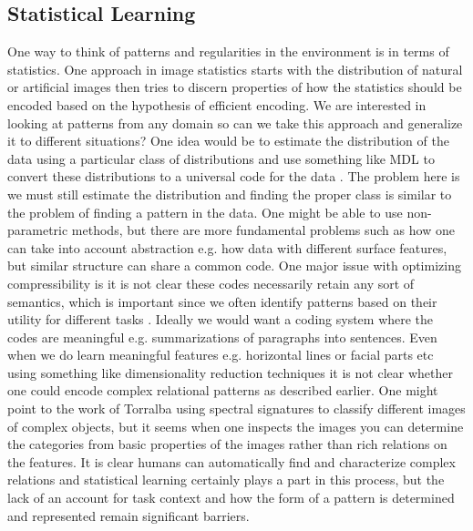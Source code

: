 \documentclass[doc]{apa}%
\begin{document}
\subsection{Statistical Learning}
One way to think of patterns and regularities in the environment is in
terms of statistics.  One approach in image statistics
\cite{Simoncelli01} starts with the distribution of natural or
artificial images then tries to discern properties of how the
statistics should be encoded based on the hypothesis of efficient
encoding.  We are interested in looking at patterns from any domain so
can we take this approach and generalize it to different situations?
One idea would be to estimate the distribution of the data using a
particular class of distributions and use something like MDL to
convert these distributions to a universal code for the data
\cite{MDLbook}.  The problem here is we must still estimate the
distribution and finding the proper class is similar to the problem of
finding a pattern in the data.  One might be able to use
non-parametric methods, but there are more fundamental problems such
as how one can take into account abstraction e.g. how data with
different surface features, but similar structure can share a common code.  One
major issue with optimizing compressibility is it is not clear
these codes necessarily retain any sort of semantics, which is
important since we often identify patterns based on their utility for
different tasks \cite{RossBFest}.  Ideally we would want a coding system where the
codes are meaningful e.g. summarizations of paragraphs into sentences.
Even when we do learn meaningful features e.g. horizontal lines or
facial parts etc using something like dimensionality reduction
techniques it is not clear whether one could encode complex relational
patterns as described earlier.  One might point to the work of
Torralba \cite{torr03}
using spectral signatures to classify different images of complex
objects, but it seems when one inspects the images you can determine
the categories from basic properties of the images rather than rich
relations on the features.  It is clear humans can automatically find
and characterize complex relations and statistical learning certainly
plays a part in this process, but the lack of an account for task
context and how the form of a pattern is determined and represented remain significant barriers.
\end{document}
